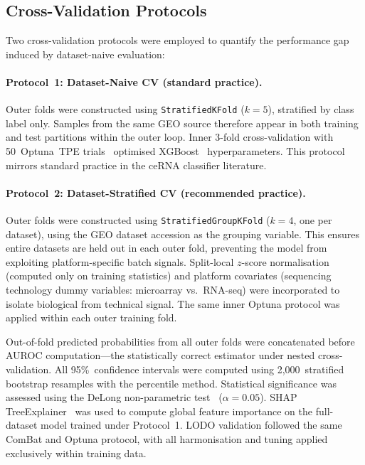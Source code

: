 \documentclass[12pt]{article}
\begin{document}
\subsection{Cross-Validation Protocols}

Two cross-validation protocols were employed to quantify the
performance gap induced by dataset-naive evaluation:

\paragraph{Protocol~1: Dataset-Naive CV (standard practice).}
Outer folds were constructed using \texttt{StratifiedKFold} ($k=5$),
stratified by class label only. Samples from the same GEO source
therefore appear in both training and test partitions within the outer
loop. Inner 3-fold cross-validation with 50~Optuna~TPE
trials~\citep{akiba2019} optimised XGBoost~\citep{chen2016}
hyperparameters. This protocol mirrors standard practice in the ceRNA
classifier literature.

\paragraph{Protocol~2: Dataset-Stratified CV (recommended practice).}
Outer folds were constructed using \texttt{StratifiedGroupKFold}
($k=4$, one per dataset), using the GEO dataset accession as the
grouping variable. This ensures entire datasets are held out in each
outer fold, preventing the model from exploiting platform-specific
batch signals. Split-local $z$-score normalisation (computed only on
training statistics) and platform covariates (sequencing technology
dummy variables: microarray vs.\ RNA-seq) were incorporated to isolate
biological from technical signal. The same inner Optuna protocol was
applied within each outer training fold.

Out-of-fold predicted probabilities from all outer folds were
concatenated before AUROC computation---the statistically correct
estimator under nested cross-validation. All 95\%~confidence intervals
were computed using 2,000~stratified bootstrap resamples with the
percentile method. Statistical significance was assessed using the
DeLong non-parametric test~\citep{delong1988} ($\alpha=0.05$). SHAP
TreeExplainer~\citep{lundberg2017} was used to compute global feature
importance on the full-dataset model trained under Protocol~1. LODO
validation followed the same ComBat and Optuna protocol, with all
harmonisation and tuning applied exclusively within training data.
\end{document}

